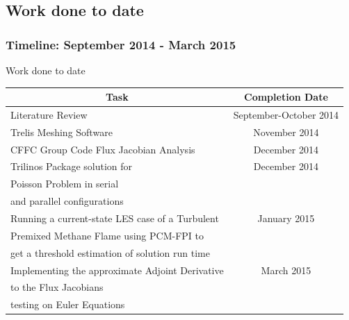 \documentclass{beamer}
\begin{document}
\subsection[Present]{Work done to date}
\begin{frame}%
\frametitle{Timeline: September 2014  - March 2015}
\scriptsize

\begin{minipage}[t][1\textheight]{1\textwidth}
\vspace{-20pt}
\begin{exampleblock}{Work done to date}

\begin{tabular}{|l|c|} \hline
\multicolumn{1}{|c|}{\bf{Task}} & \multicolumn{1}{|c|}{\bf{Completion Date}} \\

\hline Literature Review & September-October 2014 \\

\hline Trelis Meshing Software & November 2014 \\

\hline CFFC Group Code Flux Jacobian Analysis & December 2014 \\

\hline Trilinos Package solution for & December 2014 \\ Poisson Problem in serial &\\and parallel configurations & \\

\hline Running a current-state LES case of a Turbulent & January 2015\\ Premixed  Methane Flame using PCM-FPI to & \\ get a threshold estimation of solution run time &\\

\hline Implementing the approximate Adjoint Derivative & March 2015 \\  to the Flux Jacobians &\\ testing on Euler Equations  &\\

\hline
\end{tabular}

\end{exampleblock}
\end{minipage}

\end{frame}
\end{document}
